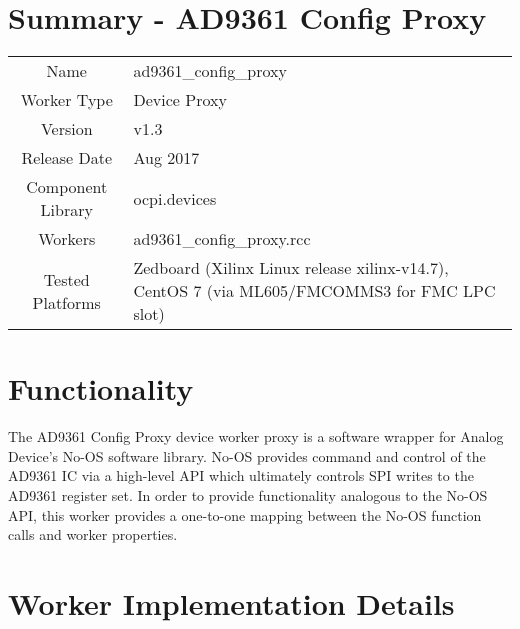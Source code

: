 \documentclass{article}
\author{} %
\date{Version \docVersion} %
\title{\docTitle}
\def\docVersion{1.3}
\def\comp{ad9361\_config\_proxy}
\def\Comp{AD9361 Config Proxy}
\begin{document}
\section*{Summary - \Comp}
\begin{tabular}{|c|M{13.5cm}|}
	\hline
	                  &                  \\
	\hline
	Name              & \comp            \\
	\hline
	Worker Type       & Device Proxy     \\
	\hline
	Version           & v\docVersion{}   \\
	\hline
	Release Date      & Aug 2017         \\
	\hline
	Component Library & ocpi.devices     \\
	\hline
	Workers           & \comp.rcc        \\
	\hline
	Tested Platforms  & Zedboard (Xilinx Linux release xilinx-v14.7\cite{xilinx_linux}), CentOS 7 (via ML605/FMCOMMS3 for FMC LPC slot) \\
	\hline
\end{tabular}
\section*{Functionality}
	The \Comp{} device worker proxy is a software wrapper for Analog Device's No-OS software library\cite{no_os}. No-OS provides command and control of the AD9361 IC\cite{ad9361} via a high-level API which ultimately controls SPI writes to the AD9361 register set. In order to provide functionality analogous to the No-OS API, this worker provides a one-to-one mapping between the No-OS function calls and worker properties.
\section*{Worker Implementation Details}
\end{document}
